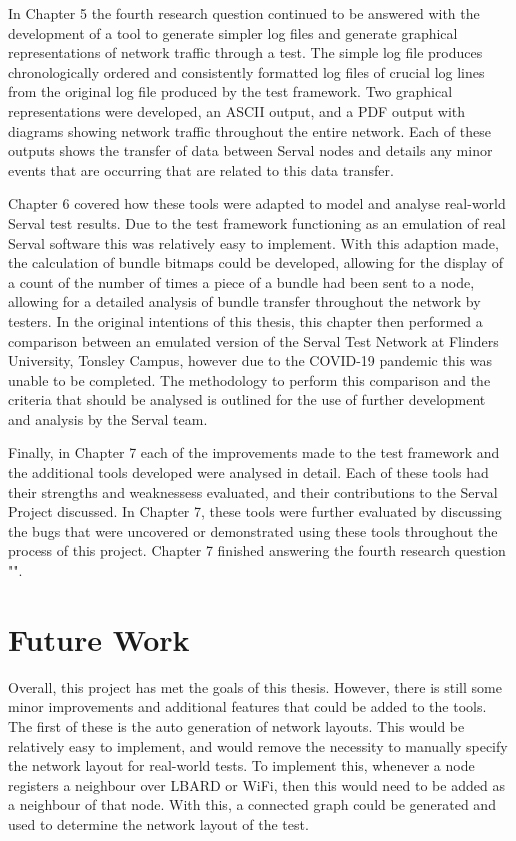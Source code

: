 In Chapter 5 the fourth research question continued to be answered with the development of a tool to generate simpler log files and generate graphical representations of network traffic through a test.
The simple log file produces chronologically ordered and consistently formatted log files of crucial log lines from the original log file produced by the test framework.
Two graphical representations were developed, an ASCII output, and a PDF output with diagrams showing network traffic throughout the entire network.
Each of these outputs shows the transfer of data between Serval nodes and details any minor events that are occurring that are related to this data transfer.

Chapter 6 covered how these tools were adapted to model and analyse real-world Serval test results.
Due to the test framework functioning as an emulation of real Serval software this was relatively easy to implement.
With this adaption made, the calculation of bundle bitmaps could be developed, allowing for the display of a count of the number of times a piece of a bundle had been sent to a node, allowing for a detailed analysis of bundle transfer throughout the network by testers.
In the original intentions of this thesis, this chapter then performed a comparison between an emulated version of the Serval Test Network at Flinders University, Tonsley Campus, however due to the COVID-19 pandemic this was unable to be completed.
The methodology to perform this comparison and the criteria that should be analysed is outlined for the use of further development and analysis by the Serval team.

Finally, in Chapter 7 each of the improvements made to the test framework and the additional tools developed were analysed in detail.
Each of these tools had their strengths and weaknessess evaluated, and their contributions to the Serval Project discussed.
In Chapter 7, these tools were further evaluated by discussing the bugs that were uncovered or demonstrated using these tools throughout the process of this project.
Chapter 7 finished answering the fourth research question "\fourthRQ".



\section{Future Work}
Overall, this project has met the goals of this thesis.
However, there is still some minor improvements and additional features that could be added to the tools.
The first of these is the auto generation of network layouts.
This would be relatively easy to implement, and would remove the necessity to manually specify the network layout for real-world tests.
To implement this, whenever a node registers a neighbour over LBARD or WiFi, then this would need to be added as a neighbour of that node.
With this, a connected graph could be generated and used to determine the network layout of the test.

